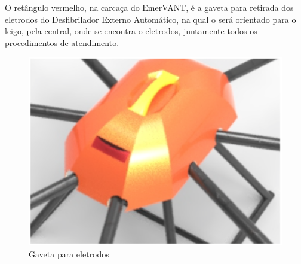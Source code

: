 O retângulo vermelho, na carcaça do EmerVANT, é a gaveta para retirada dos eletrodos do Desfibrilador Externo Automático, na qual o será orientado para o leigo, pela central, onde se encontra o eletrodos, juntamente todos os procedimentos de atendimento.

\begin{figure}[H]
    \centering
      \includegraphics[keepaspectratio=true,scale=0.5]{figuras/keyshot2.eps}
    \caption{ Gaveta para eletrodos}
    \label{fig:keyshot2}
\end{figure}





















